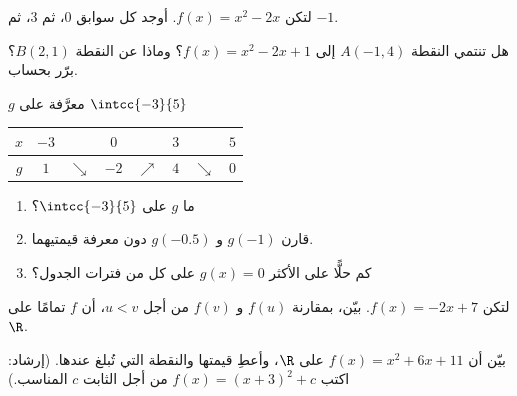 \begin{exercise}[$\star$]\label{exo:g10:functions:3}
لتكن $f(x) = x^2 - 2x$. أوجد كل سوابق $0$، ثم $3$، ثم $-1$.
\end{exercise}

\begin{exercise}[$\star$]\label{exo:g10:functions:4}
هل تنتمي النقطة $A(-1, 4)$ إلى   $f(x) = x^2 - 2x + 1$؟
وماذا عن النقطة $B(2, 1)$؟ برّر بحساب.
\end{exercise}

\begin{exercise}[$\star$]\label{exo:g10:functions:5}
 $g$ معرَّفة على $\intcc{-3}{5}$ 
\begin{center}
\renewcommand{\arraystretch}{1.3}
\begin{tabular}{c|ccccccc}
$x$ & $-3$ & & $0$ & & $3$ & & $5$ \\
\hline
$g$ & $1$ & $\searrow$ & $-2$ & $\nearrow$ & $4$ & $\searrow$ & $0$ \\
\end{tabular}
\end{center}
\begin{enumerate}
  \item ما    $g$ على $\intcc{-3}{5}$؟
  \item قارن $g(-1)$ و $g(-0.5)$ دون معرفة قيمتيهما.
  \item كم حلًّا على الأكثر  $g(x) = 0$ على
        كل  من فترات الجدول؟
\end{enumerate}
\end{exercise}

\begin{exercise}[$\star\star$]\label{exo:g10:functions:6}
لتكن $f(x) = -2x + 7$. بيّن، بمقارنة $f(u)$ و $f(v)$ من أجل $u < v$،
أن $f$  تمامًا على $\R$.
\end{exercise}

\begin{exercise}[$\star\star$]\label{exo:g10:functions:7}
بيّن أن  $f(x) = x^2 + 6x + 11$  على $\R$، وأعطِ
قيمتها والنقطة التي تُبلغ عندها. (إرشاد: اكتب
$f(x) = (x + 3)^2 + c$ من أجل الثابت $c$ المناسب.)
\end{exercise}

